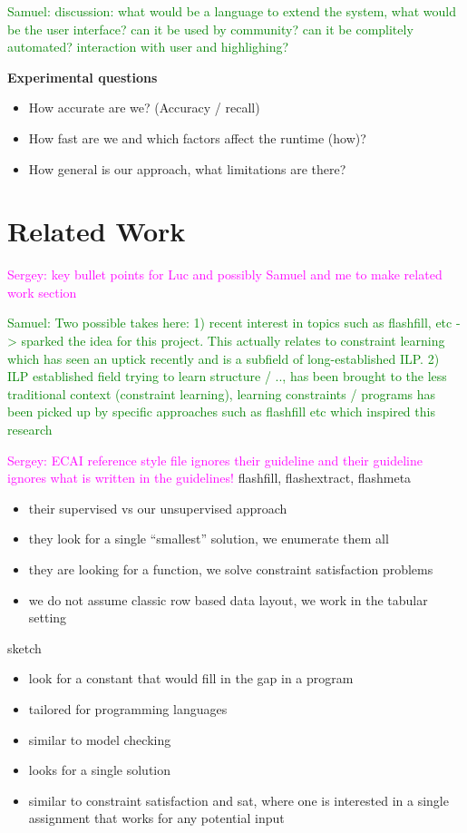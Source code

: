\documentclass{sig-alternate-05-2015}
\newcommand{\sergey}[1]{\textcolor{magenta}{{\sc Sergey:} #1}\xspace}
\newcommand{\samuel}[1]{\textcolor{green}{{\sc Samuel:} #1}\xspace}
\begin{document}
\samuel{discussion: what would be a language to extend the system, what would be the user interface? can it be used by community?  can it be complitely automated? interaction with user and highlighing?
}

{\bfseries
  Experimental questions
}

\begin{itemize}
  \item  How accurate are we? (Accuracy / recall)
  \item  How fast are we and which factors affect the runtime (how)?
  \item  How general is our approach, what limitations are there?
\end{itemize}


\section{Related Work}\label{sec:related_work}
\sergey{key bullet points for Luc and possibly Samuel and me to make related work section}

\samuel{Two possible takes here: 1) recent interest in topics such as flashfill, etc -> sparked the idea for this project. This actually relates to constraint learning which has seen an uptick recently and is a subfield of long-established ILP. 2) ILP established field trying to learn structure / .., has been brought to the less traditional context (constraint learning), learning constraints / programs has been picked up by specific approaches such as flashfill etc which inspired this research}

\sergey{ECAI reference style file ignores their guideline and their guideline ignores what is written in the guidelines!}
flashfill, flashextract, flashmeta \cite{flashfill,flashextract,flashmeta}
\begin{itemize}
  \item their supervised vs our unsupervised approach
  \item they look for a single ``smallest'' solution, we enumerate them all
  \item they are looking for a function, we solve constraint satisfaction problems
  \item we do not assume classic row based data layout, we work in the tabular setting
\end{itemize}

sketch \cite{sketch}
\begin{itemize}
  \item look for a constant that would fill in the gap in a program
  \item tailored for programming languages
  \item similar to model checking
  \item looks for a single solution
  \item similar to constraint satisfaction and sat, where one is interested in a single assignment that works for any potential input
\end{itemize}
\end{document}
